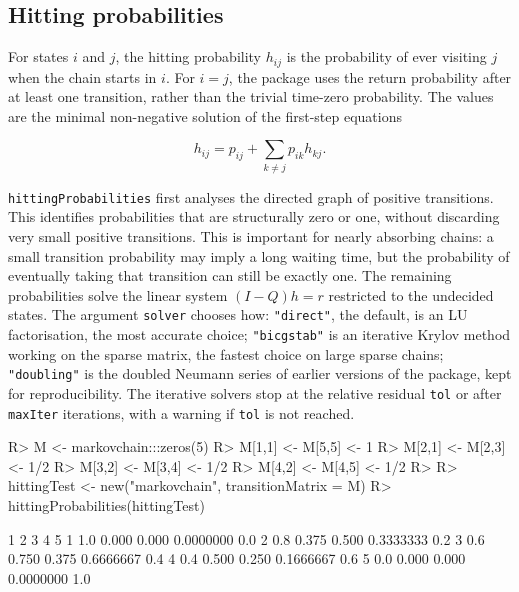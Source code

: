 \documentclass[
  nojss]{jss}
\begin{document}
\subsection{Hitting probabilities}\label{hitting-probabilities}

For states \(i\) and \(j\), the hitting probability \(h_{ij}\) is the probability of
ever visiting \(j\) when the chain starts in \(i\). For \(i = j\), the package uses
the return probability after at least one transition, rather than the trivial
time-zero probability. The values are the minimal non-negative solution of the
first-step equations

\begin{equation}
h_{ij}=p_{ij}+\sum_{k\ne j}p_{ik}h_{kj}.
\end{equation}

\texttt{hittingProbabilities} first analyses the directed graph of positive transitions.
This identifies probabilities that are structurally zero or one, without
discarding very small positive transitions. This is important for nearly
absorbing chains: a small transition probability may imply a long waiting time,
but the probability of eventually taking that transition can still be exactly
one. The remaining probabilities solve the linear system \((I-Q)h=r\) restricted to
the undecided states. The argument \texttt{solver} chooses how: \texttt{"direct"}, the default,
is an LU factorisation, the most accurate choice; \texttt{"bicgstab"} is an iterative
Krylov method \citep{vandervorst1992} working on the sparse matrix, the fastest
choice on large sparse chains; \texttt{"doubling"} is the doubled Neumann series of
earlier versions of the package, kept for reproducibility. The iterative solvers
stop at the relative residual \texttt{tol} or after \texttt{maxIter} iterations, with a warning
if \texttt{tol} is not reached.

\begin{CodeChunk}
\begin{CodeInput}
R> M <- markovchain:::zeros(5)
R> M[1,1] <- M[5,5] <- 1
R> M[2,1] <- M[2,3] <- 1/2
R> M[3,2] <- M[3,4] <- 1/2
R> M[4,2] <- M[4,5] <- 1/2
R> 
R> hittingTest <- new("markovchain", transitionMatrix = M)
R> hittingProbabilities(hittingTest)
\end{CodeInput}
\begin{CodeOutput}
    1     2     3         4   5
1 1.0 0.000 0.000 0.0000000 0.0
2 0.8 0.375 0.500 0.3333333 0.2
3 0.6 0.750 0.375 0.6666667 0.4
4 0.4 0.500 0.250 0.1666667 0.6
5 0.0 0.000 0.000 0.0000000 1.0
\end{CodeOutput}
\end{CodeChunk}
\end{document}
